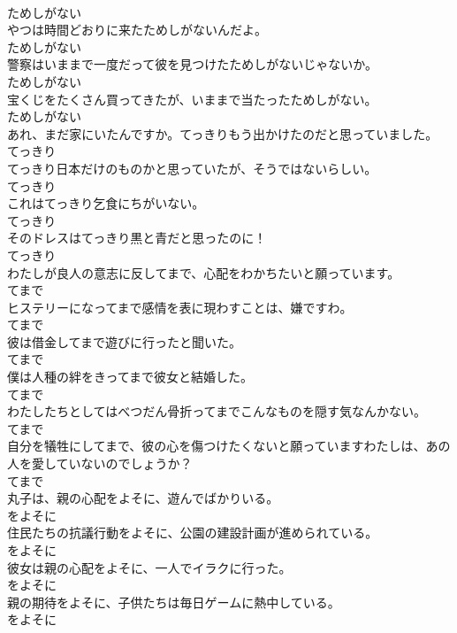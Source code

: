 \documentclass[8pt]{extreport}
\begin{document}
\begin{CJK}{UTF8}{min}
\\	ためしがない
\\	やつは時間どおりに来たためしがないんだよ。	
\\	ためしがない
\\	警察はいままで一度だって彼を見つけたためしがないじゃないか。	
\\	ためしがない
\\	宝くじをたくさん買ってきたが、いままで当たったためしがない。	
\\	ためしがない
\\	あれ、まだ家にいたんですか。てっきりもう出かけたのだと思っていました。	
\\	てっきり
\\	てっきり日本だけのものかと思っていたが、そうではないらしい。	
\\	てっきり
\\	これはてっきり乞食にちがいない。	
\\	てっきり
\\	そのドレスはてっきり黒と青だと思ったのに！	
\\	てっきり
\\	わたしが良人の意志に反してまで、心配をわかちたいと願っています。	
\\	てまで
\\	ヒステリーになってまで感情を表に現わすことは、嫌ですわ。	
\\	てまで
\\	彼は借金してまで遊びに行ったと聞いた。	
\\	てまで
\\	僕は人種の絆をきってまで彼女と結婚した。	
\\	てまで
\\	わたしたちとしてはべつだん骨折ってまでこんなものを隠す気なんかない。	
\\	てまで
\\	自分を犠牲にしてまで、彼の心を傷つけたくないと願っていますわたしは、あの人を愛していないのでしょうか？	
\\	てまで
\\	丸子は、親の心配をよそに、遊んでばかりいる。	
\\	をよそに
\\	住民たちの抗議行動をよそに、公園の建設計画が進められている。	
\\	をよそに
\\	彼女は親の心配をよそに、一人でイラクに行った。	
\\	をよそに
\\	親の期待をよそに、子供たちは毎日ゲームに熱中している。	
\\	をよそに

\end{CJK}
\end{document}
